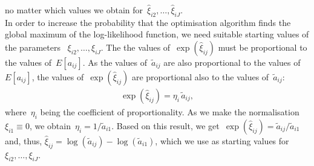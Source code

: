 \documentclass[12pt]{article}
\begin{document}
no matter which values we obtain for~$\hat{\xi}_{i2}, \ldots, \hat{\xi}_{iJ}$.
\\[0.25cm]
In order to increase the probability 
that the optimisation algorithm finds the global maximum of the log-likelihood function, we need suitable starting values of the parameters%
~$\xi_{i2}, \ldots, \xi_{iJ}$.
The the values of~$\exp( \hat{\xi}_{ij} )$ must be proportional to the values of~$E[ a_{ij} ]$.
As the values of~$\tilde{a}_{ij}$ are also proportional to the values of~$E[ a_{ij} ]$, the values of~$\exp( \hat{\xi}_{ij} )$ are proportional also to the values of~$\tilde{a}_{ij}$:
\begin{align}
    \exp( \hat{\xi}_{ij} ) = \eta_i \, \tilde{a}_{ij},
\end{align}
where~$\eta_i$ being the coefficient of proportionality.
As we make the normalisation~$\xi_{i1} \equiv 0$, we obtain~$\eta_i = 1 / \tilde{a}_{i1}$.
Based on this result, we get~$\exp( \hat{\xi}_{ij} ) = \tilde{a}_{ij} / \tilde{a}_{i1}$
and, thus, $\hat{\xi}_{ij} = \log( \tilde{a}_{ij} ) 
- \log ( \tilde{a}_{i1} )$, which we use as starting values for~$\xi_{i2}, \ldots, \xi_{iJ}$.



\newpage



\end{document}
